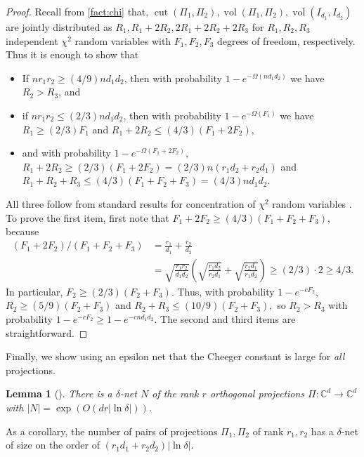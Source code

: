 \documentclass{article}
\newtheorem{lemma}[theorem]{Lemma}
\newcommand{\C}{{\mathbb{C}}}
\newcommand{\cut}{\operatorname{cut}}
\newcommand{\vol}{\operatorname{vol}}
\begin{document}
\begin{proof}
Recall from \cref{fact:chi} that, $\cut(\Pi_1, \Pi_2), \vol(\Pi_1, \Pi_2), \vol(I_{d_1}, I_{d_2})$ are jointly distributed as $R_1, R_1 + 2R_2, 2R_1 + 2R_2 + 2R_3$ for $R_1, R_2, R_3$ independent $\chi^2$ random variables with $F_1, F_2, F_3$ degrees of freedom, respectively. Thus it is enough to show that
\begin{itemize}
\item If $nr_1 r_2 \geq (4/9) n d_1 d_2$, then with probability $1 - e^{- \Omega( n d_1 d_2)}$ we have $R_2 > R_3$, and
\item if $nr_1 r_2 \leq (2/3) n d_1 d_2$, then with probability $1 - e^{- \Omega(F_1)}$ we have $R_1 \geq (2/3) F_1$ and $R_1 + 2R_2 \leq (4/3) (F_1 + 2 F_2),$
\item and with probability $1 - e^{- \Omega(F_1 + 2 F_2)}$, $R_1 + 2R_2 \geq (2/3) (F_1 + 2 F_2) = (2/3) n (r_1 d_2 + r_2 d_1)$ and $R_1 + R_2 + R_3 \leq (4/3)(F_1 + F_2 + F_3) = (4/3)n d_1 d_2$.
\end{itemize}
All three follow from standard results for concentration of $\chi^2$ random variables \cite{W19}. To prove the first item, first note that $F_1 + 2 F_2 \geq (4/3)(F_1 + F_2 + F_3)$, because
\begin{align*}
(F_1 + 2 F_2)/( F_1 + F_2 + F_3) &= \frac{r_1}{d_1} + \frac{r_2}{d_2}\\
 &= \sqrt{ \frac{r_1 r_2}{d_1 d_2}}\left( \sqrt{ \frac{r_1 d_2}{r_2 d_1}} + \sqrt{ \frac{r_2 d_1}{r_1 d_2}}\right) \geq (2/3) \cdot 2 \geq 4/3.
\end{align*}
In particular, $F_2 \geq (2/3)(F_2 + F_3)$. Thus, with probability $1 - e^{- c F_2}$, $R_2 \geq (5/9) (F_2 + F_3)$ and $R_2 + R_3 \leq (10/9) (F _2 + F_3),$ so $R_2 > R_3$ with probability $1 - e^{- c F_2} \geq 1 - e^{- c n d_1 d_2}$. The second and third items are straightforward.
\end{proof}

Finally, we show using an epsilon net that the Cheeger constant is large for \emph{all} projections.
\begin{lemma}[\cite{FM20}]\label{lem:net} There is a $\delta$-net $N$ of the rank $r$ orthogonal projections $\Pi: \C^d \to \C^d$ with $|N| = \exp(O(d r |\ln \delta|))$.
\end{lemma}
As a corollary, the number of pairs of projections $\Pi_1, \Pi_2$ of rank $r_1, r_2$ has a $\delta$-net of size on the order of $(r_1 d_1 + r_2 d_2) |\ln \delta|$.
\end{document}
